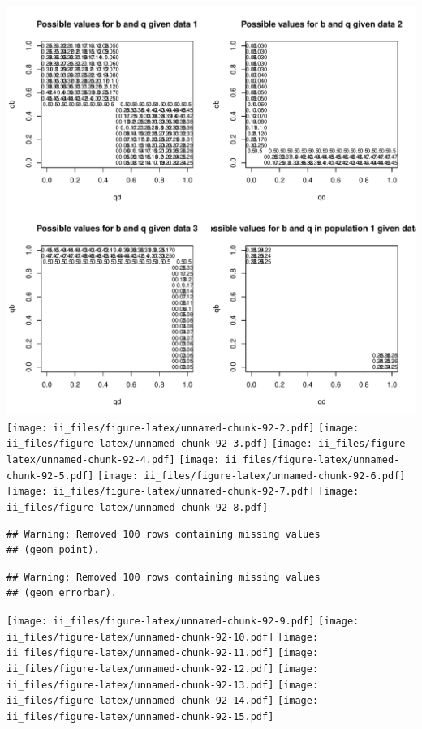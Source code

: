 \documentclass[12pt,]{book}
\begin{document}
\includegraphics{ii_files/figure-latex/unnamed-chunk-92-1.pdf} \texttt{[image: ii\_files/figure-latex/unnamed-chunk-92-2.pdf]} \texttt{[image: ii\_files/figure-latex/unnamed-chunk-92-3.pdf]} \texttt{[image: ii\_files/figure-latex/unnamed-chunk-92-4.pdf]} \texttt{[image: ii\_files/figure-latex/unnamed-chunk-92-5.pdf]} \texttt{[image: ii\_files/figure-latex/unnamed-chunk-92-6.pdf]} \texttt{[image: ii\_files/figure-latex/unnamed-chunk-92-7.pdf]} \texttt{[image: ii\_files/figure-latex/unnamed-chunk-92-8.pdf]}

\begin{verbatim}
## Warning: Removed 100 rows containing missing values
## (geom_point).
\end{verbatim}

\begin{verbatim}
## Warning: Removed 100 rows containing missing values
## (geom_errorbar).
\end{verbatim}

\texttt{[image: ii\_files/figure-latex/unnamed-chunk-92-9.pdf]} \texttt{[image: ii\_files/figure-latex/unnamed-chunk-92-10.pdf]} \texttt{[image: ii\_files/figure-latex/unnamed-chunk-92-11.pdf]} \texttt{[image: ii\_files/figure-latex/unnamed-chunk-92-12.pdf]} \texttt{[image: ii\_files/figure-latex/unnamed-chunk-92-13.pdf]} \texttt{[image: ii\_files/figure-latex/unnamed-chunk-92-14.pdf]} \texttt{[image: ii\_files/figure-latex/unnamed-chunk-92-15.pdf]}
\end{document}
